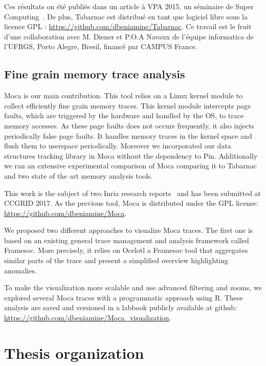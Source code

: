 Ces résultats on été publiés dans un article à \gls{VPA} 2015, un séminaire de Super Computing~\cite{Beniamine15TABARNAC}.
De plus, \gls{Tabarnac} est distribué en tant que logiciel libre sous la licence \gls{GPL} : \url{https://github.com/dbeniamine/Tabarnac}.
Ce travail est le fruit d'une collaboration avec M. Diener et P.O.A Navaux de l'équipe informatica de l'\gls{UFRGS}, Porto Alegre, Bresil, financé par CAMPUS France.

\subsection{Fine grain memory trace analysis}

\gls{Moca} is our main contribution.
This tool relies on a \gls{Linux} kernel module to collect efficiently fine grain memory traces.
This kernel module intercepts page faults, which are triggered by the hardware and handled by the \gls{OS}, to trace memory accesses.
As these page faults does not occurs frequently, it also injects periodically false page faults.
It handles memory traces in the kernel space and flush them to userspace periodically.
Moreover we incorporated our data structures tracking library in \gls{Moca} without the dependency to \gls{Pin}.
Additionally we ran an extensive experimental comparison of \gls{Moca} comparing it to \gls{Tabarnac} and two state of the art memory analysis tools.

This work is the subject of two Inria research reports~\cite{Beniamine15Memory,Beniamine16Moca} and has been submitted at \gls{CCGRID} 2017.
As the previous tool, \gls{Moca} is distributed under the \gls{GPL} license:\\
\url{https://github.com/dbeniamine/Moca}.

We proposed two different approaches to visualize \gls{Moca} traces.
The first one is based on an existing general trace management and analysis framework called \gls{Framesoc}.
More precisely, it relies on \gls{Ocelotl} a \gls{Framesoc} tool that aggregates similar parts of the trace and present a simplified overview highlighting anomalies.

To make the visualization more scalable and use advanced filtering and zooms, we explored several \gls{Moca} traces with a programmatic approach using \gls{R}.
These analysis are saved and versioned in a labbook publicly available at github: \url{https://github.com/dbeniamine/Moca_visualization}.

\section{Thesis organization}

